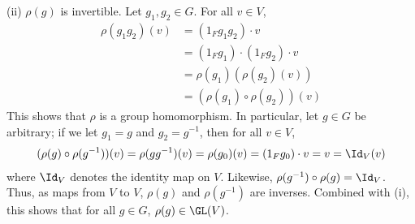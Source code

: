 {(ii) $\rho(g)$ is invertible. Let $g_{1}, g_{2} \in G$. For all $v \in V$,
\begin{align*}
\rho(g_{1} g_{2})(v)
&=
(1_{F} g_{1} g_{2}) \cdot v
\\
&=
(1_{F} g_{1}) \cdot (1_{F} g_{2}) \cdot v
\\
&=
\rho(g_{1})(\rho(g_{2})(v))
\\
&=
(\rho(g_{1}) \circ \rho(g_{2}))(v)
\end{align*}
This shows that $\rho$ is a group homomorphism. In particular, let $g \in G$ be arbitrary; if we let $g_{1} = g$ and $g_{2} = g^{-1}$, then for all $v \in V$,
\begin{align*}
(\rho(g) \circ \rho(g^{-1}))(v)
=
\rho(g g^{-1})(v)
=
\rho(g_{0})(v)
=
(1_{F} g_{0}) \cdot v
=
v
=
\Id_{V}(v)
\end{align*}
where $\Id_{V}$ denotes the identity map on $V$. Likewise, $\rho(g^{-1}) \circ \rho(g) = \Id_{V}$. Thus, as maps from $V$ to $V$, $\rho(g)$ and $\rho(g^{-1})$ are inverses. Combined with (i), this shows that for all $g \in G$, $\rho(g) \in \GL(V)$.}%